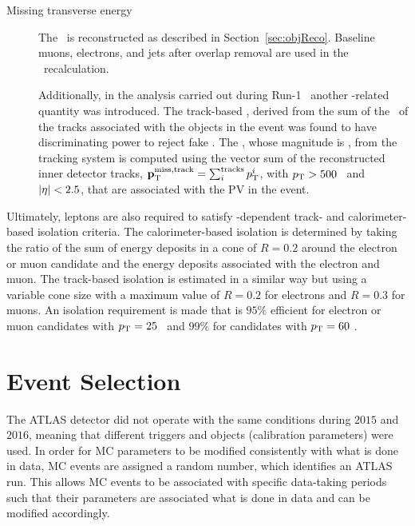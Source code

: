 \begin{description}
			\item[Missing transverse energy]
				The \met\ is reconstructed as described in Section~\ref{sec:objReco}. Baseline muons, electrons, and jets after overlap removal are used in the \met\ recalculation. 

				Additionally, in the analysis carried out during Run-1~\cite{Atlas8TeV} another \met-related quantity was introduced. The track-based \met, derived from the sum of the \pt\ of the tracks associated with the objects in the event was found to have discriminating power to reject fake \met. The \ptmisstrk, whose magnitude is \mettrk, from the tracking system is computed using the vector sum of the reconstructed inner detector tracks, $\mathbf{p}_{\mathrm{T}}^{\mathrm{miss, track}} = \sum_i^{\mathrm{tracks}} p_{\mathrm{T}}^i$, with $p_{\mathrm{T}} > 500$ \MeV\ and $|\eta| < 2.5$, that are associated with the \ac{PV} in the event. 
 		\end{description}

		Ultimately, leptons are also required to satisfy \pt-dependent track- and calorimeter-based isolation criteria. The calorimeter-based isolation is determined by taking the ratio of the sum of energy deposits in a cone of $R = 0.2$ around the electron or muon candidate and the energy deposits associated with the electron and muon. The track-based isolation is estimated in a similar way but using a variable cone size with a maximum value of $R = 0.2$ for electrons and $R = 0.3$ for muons. An isolation requirement is made that is $95\%$ efficient for electron or muon candidates with $p_{\mathrm{T}} = 25$ \GeV\ and $99\%$ for candidates with $p_{\mathrm{T}} = 60$ \GeV.


	\section{Event Selection}
	\label{sec:evtsel}

		The \ac{ATLAS} detector did not operate with the same conditions during $2015$ and $2016$, meaning that different triggers and objects (calibration parameters) were used. In order for \ac{MC} parameters to be modified consistently with what is done in data, \ac{MC} events are assigned a random number, which identifies an ATLAS run. This allows \ac{MC} events to be associated with specific data-taking periods such that their parameters are associated what is done in data and can be modified accordingly.

